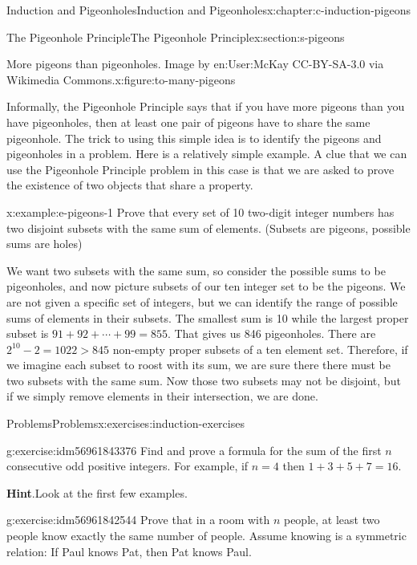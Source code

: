 \documentclass[twoside,10pt,]{book}
\newcommand{\blocktitlefont}{\relax}
\numberwithin{equation}{section}
\begin{document}
\begin{chapterptx}{Induction and Pigeonholes}{}{Induction and Pigeonholes}{}{}{x:chapter:c-induction-pigeons}
\begin{sectionptx}{The Pigeonhole Principle}{}{The Pigeonhole Principle}{}{}{x:section:s-pigeons}
\begin{figureptx}{More pigeons than pigeonholes.  Image by en:User:McKay CC-BY-SA-3.0 via Wikimedia Commons.}{x:figure:to-many-pigeons}{}
\begin{image}{0}{1}{0}
\end{image}%
\tcblower
\end{figureptx}%
Informally, the Pigeonhole Principle says that if you have more pigeons than you have pigeonholes, then at least one pair of pigeons have to share the same pigeonhole. The trick to using this simple idea is to identify the pigeons and pigeonholes in a problem.  Here is a relatively simple example. A clue that we can use the Pigeonhole Principle problem in this case is that we are asked to prove the existence of two objects that share a property.%
\begin{example}{}{x:example:e-pigeons-1}%
Prove that every set of 10 two-digit integer numbers has two disjoint subsets with the same sum of elements. (Subsets are pigeons, possible sums are holes)%
\par
We want two subsets with the same sum, so consider the possible sums to be pigeonholes, and now picture subsets of our ten integer set to be the pigeons. We are not given a specific set of integers, but we can identify the range of possible sums of elements in their subsets.  The smallest sum is 10 while the largest proper subset is \(91+92+\cdots+99 =855 \). That gives us 846 pigeonholes.  There are \(2^{10}-2 = 1022 > 845\) non-empty proper subsets of a ten element set.  Therefore, if we imagine each subset to roost with its sum, we are sure there there must be two subsets with the same sum.  Now those two subsets may not be disjoint, but if we simply remove elements in their intersection, we are done.%
\end{example}
\end{sectionptx}
%
%
\typeout{************************************************}
\typeout{************************************************}
%
\begin{exercises-section}{Problems}{}{Problems}{}{}{x:exercises:induction-exercises}
\begin{divisionexercise}{1}{}{}{g:exercise:idm56961843376}%
Find and prove a formula for the sum of the first \(n\) consecutive odd positive integers. For example, if \(n = 4\) then \(1 + 3 + 5 + 7 = 16\).%
\par\smallskip%
\noindent\textbf{\blocktitlefont Hint}.\hypertarget{g:hint:idm56961842080}{}\quad{}Look at the first few examples.%
\end{divisionexercise}%
\begin{divisionexercise}{2}{}{}{g:exercise:idm56961842544}%
Prove that in a room with \(n\) people, at least two people know exactly the same number of people. Assume knowing is a symmetric relation: If Paul knows Pat, then Pat knows Paul.%

\end{divisionexercise}
\end{exercises-section}
\end{chapterptx}
\end{document}
